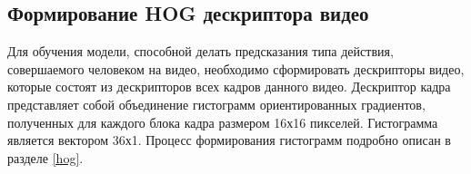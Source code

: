 \subsection{Формирование HOG дескриптора видео}
Для обучения модели, способной делать предсказания типа действия, совершаемого человеком на видео, необходимо сформировать дескрипторы видео, которые состоят из дескрипторов всех кадров данного видео. Дескриптор кадра представляет собой объединение гистограмм ориентированных градиентов, полученных для каждого блока кадра размером 16х16 пикселей. Гистограмма является вектором 36х1. Процесс формирования гистограмм подробно описан в разделе \ref{hog}.








